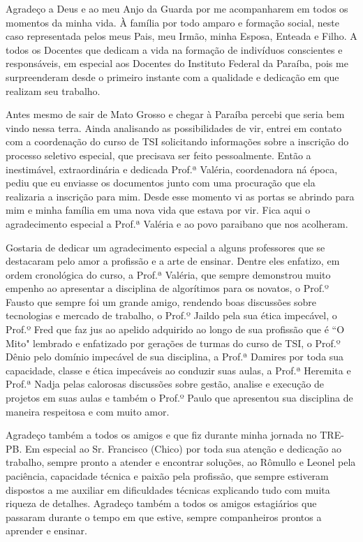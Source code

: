
\begin{agradecimentos}[AGRADECIMENTOS]

    Agradeço a Deus e ao meu Anjo da Guarda  por me acompanharem em todos os momentos da minha vida. 
    À família por todo amparo e formação social, neste caso representada pelos meus Pais, meu Irmão, minha Esposa, Enteada e Filho. 
    A todos os Docentes que dedicam a vida na formação de indivíduos conscientes e responsáveis, em especial aos Docentes do Instituto Federal da Paraíba, pois me surpreenderam desde o primeiro instante com a qualidade e dedicação em que realizam seu trabalho.

    Antes mesmo de sair de Mato Grosso e chegar à Paraíba percebi que seria bem vindo nessa terra. Ainda analisando as possibilidades de vir, entrei em contato com a coordenação do curso de TSI solicitando informações sobre a inscrição do processo seletivo especial, que precisava ser feito pessoalmente. Então a inestimável, extraordinária e dedicada Prof.ª Valéria, coordenadora ná época, pediu que eu enviasse os documentos junto com uma procuração que ela realizaria a inscrição para mim. Desde esse momento vi as portas se abrindo para mim e minha família em uma nova vida que estava por vir. Fica aqui o agradecimento especial a Prof.ª Valéria e ao povo paraibano que nos acolheram.

    Gostaria de dedicar um agradecimento especial a alguns professores que se destacaram pelo amor a profissão e a arte de ensinar. Dentre eles enfatizo, em ordem cronológica do curso, a Prof.ª Valéria, que sempre demonstrou muito empenho ao apresentar a disciplina de algorítimos para os novatos, o Prof.º Fausto que sempre foi um grande amigo, rendendo boas discussões sobre tecnologias e mercado de trabalho, o Prof.º Jaildo pela sua ética impecável, o Prof.º Fred que faz jus ao apelido adquirido ao longo de sua profissão que é ``O Mito" \space lembrado e enfatizado por gerações de turmas do curso de TSI, o Prof.º Dênio pelo domínio impecável de sua disciplina, a Prof.ª Damires por toda sua capacidade, classe e ética impecáveis ao conduzir suas aulas, a Prof.ª Heremita e Prof.ª Nadja pelas calorosas discussões sobre gestão, analise e execução de projetos em suas aulas e também o Prof.º Paulo que apresentou sua disciplina de maneira respeitosa e com muito amor.
    
    Agradeço também a todos os amigos e que fiz durante minha jornada no TRE-PB. Em especial ao Sr. Francisco (Chico) por toda sua atenção e dedicação ao trabalho, sempre pronto a atender e encontrar soluções, ao Rômullo e Leonel pela paciência, capacidade técnica e paixão pela profissão, que sempre estiveram dispostos a me auxiliar em dificuldades técnicas explicando tudo com muita riqueza de detalhes. Agradeço também a todos os amigos estagiários que passaram durante o tempo em que estive, sempre companheiros prontos a aprender e ensinar.

\end{agradecimentos}
